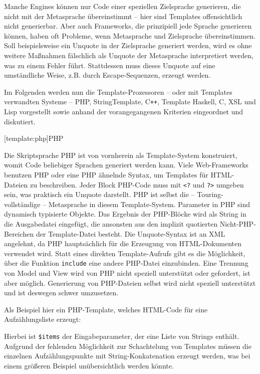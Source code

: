 \documentclass[12pt, a4paper, bibgerm]{scrbook}
\newenvironment{DIFnomarkup}{}{}
\newcommand\icode[1]{\lstinline?#1?}
\newcommand\phpo{\lstinline+<?+}
\newcommand\phpc{\lstinline+?>+}
\newcommand\lsection{}
\newcommand{\cpp}{C\texttt{++}}
\begin{document}
Manche Engines können nur Code einer speziellen Zielsprache generieren,
die nicht mit der Metasprache übereinstimmt -- hier sind Templates
offensichtlich nicht generierbar. Aber auch Frameworks, die prinzipiell
jede Sprache generieren können, haben oft Probleme, wenn Metasprache und
Zielsprache übereinstimmen. Soll beispielsweise ein Unquote in der
Zielsprache generiert werden, wird es ohne weitere Maßnahmen fälschlich
als Unquote der Metasprache interpretiert werden, was zu einem Fehler
führt. Stattdessen muss dieses Unquote auf eine umständliche Weise,
z.B. durch Escape-Sequenzen, erzeugt werden.

\medskip{}

Im Folgenden werden nun die Template-Prozessoren -- oder mit Templates
verwandten Systeme -- PHP, StringTemplate, \cpp{}, Template Haskell, C, XSL
und Lisp vorgestellt sowie anhand der vorangegangenen Kriterien
eingeordnet und diskutiert.

\lsection[template:php]{PHP}

Die Skriptsprache PHP ist von vornherein als Template-System
konstruiert, womit Code beliebiger Sprachen generiert werden kann. Viele
Web-Frameworks benutzen PHP oder eine PHP ähnelnde Syntax, um Templates
für HTML-Dateien zu beschreiben. Jeder Block PHP-Code muss mit \phpo{}
und \phpc{} umgeben sein, was praktisch ein Unquote darstellt. PHP ist
selbst die -- Touring-vollständige -- Metasprache in diesem
Template-System. Parameter in PHP sind dynamisch typisierte Objekte. Das
Ergebnis der PHP-Blöcke wird als String in die Ausgabedatei eingefügt,
die ansonsten aus den implizit quotierten Nicht-PHP-Bereichen der
Template-Datei besteht. Die Unquote-Syntax ist an XML angelehnt, da PHP
hauptsächlich für die Erzeugung von HTML-Dokumenten verwendet
wird. Statt eines direkten Template-Aufrufs gibt es die Möglichkeit,
über die Funktion \icode{include} eine andere PHP-Datei
einzubinden. Eine Trennung von Model und View wird von PHP nicht
speziell unterstützt oder gefordert, ist aber möglich. Generierung von
PHP-Dateien selbst wird nicht speziell unterstützt und ist deswegen
schwer umzusetzen.

Als Beispiel hier ein PHP-Template, welches HTML-Code für eine
Aufzählungsliste erzeugt:
\begin{DIFnomarkup}\end{DIFnomarkup} %
Hierbei ist \icode{$items} %
 der Eingabeparameter, der eine Liste von
Strings enthält.  Aufgrund der fehlenden Möglichkeit zur Schachtelung
von Templates müssen die einzelnen Aufzählungspunkte mit
String-Konkatenation erzeugt werden, was bei einem größeren Beispiel
unübersichtlich werden könnte.
\end{document}
